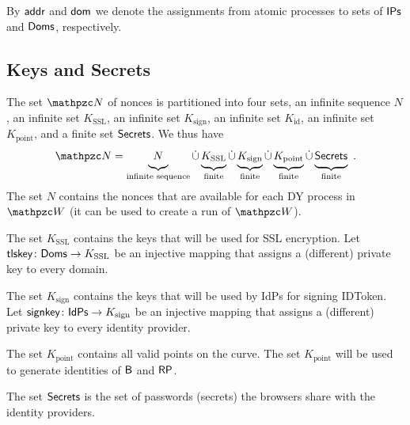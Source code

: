   By $\mathsf{addr}$ and $\mathsf{dom}$ we denote the assignments from
  atomic processes to sets of $\mathsf{IPs}$ and $\mathsf{Doms}$, respectively.
  
  \subsection{Keys and Secrets} 
  The set $\nonces$ of nonces is partitioned into four sets, 
  an infinite sequence $N$, 
  an infinite set $K_\text{SSL}$, 
  an infinite set $K_\text{sign}$, 
  an infinite set $K_\text{id}$, 
  an infinite set $K_\text{point}$, 
  and a finite set $\mathsf{Secrets}$. 
  We thus have
  \begin{align*}
  \def\hereMaxHeightPhantom{\vphantom{K_{\text{p}}^\bidsystem}}
  \nonces = 
  \underbrace{N\hereMaxHeightPhantom}_{\text{infinite sequence}} 
  \dot\cup \underbrace{K_{\text{SSL}}\hereMaxHeightPhantom}_{\text{finite}} 
  \dot\cup \underbrace{K_{\text{sign}}\hereMaxHeightPhantom}_{\text{finite}}
  \dot\cup \underbrace{K_{\text{point}}\hereMaxHeightPhantom}_{\text{finite}}  
  \dot\cup \underbrace{\RPSecrets\hereMaxHeightPhantom}_{\text{finite}}\ .
  \end{align*}
  The set $N$ contains the nonces that are available for each DY process
  in $\bidsystem$ (it can be used to create a run of $\bidsystem$). 
  
  The set $K_\text{SSL}$ contains the keys that will be used for SSL
  encryption. Let $\mathsf{tlskey}\colon \mathsf{Doms} \to K_\text{SSL}$ be an injective
  mapping that assigns a (different) private key to every domain.
  
  The set $K_\text{sign}$ contains the keys that will be used by IdPs
  for signing IDToken. Let $\mathsf{signkey}\colon \mathsf{IdPs} \to K_\text{sign}$
  be an injective mapping that assigns a (different) private key to every identity
  provider.
  
  The set $K_\text{point}$ contains all valid points on the curve. 
  The set $K_\text{point}$ will be used to generate identities of $\mathsf{B}$ and $\mathsf{RP}$.
  
  The set $\mathsf{Secrets}$ is the set of passwords (secrets) 
  the browsers share with the identity providers. 
  
  
  

